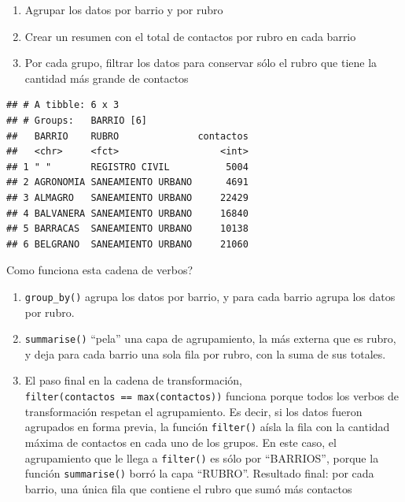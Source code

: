 \documentclass[spanish,]{book}
\newenvironment{Shaded}{\begin{snugshade}}{\end{snugshade}}
\newcommand{\DataTypeTok}[1]{\textcolor[rgb]{0.13,0.29,0.53}{#1}}
\newcommand{\KeywordTok}[1]{\textcolor[rgb]{0.13,0.29,0.53}{\textbf{#1}}}
\newcommand{\NormalTok}[1]{#1}
\newcommand{\OperatorTok}[1]{\textcolor[rgb]{0.81,0.36,0.00}{\textbf{#1}}}
\newcommand{\StringTok}[1]{\textcolor[rgb]{0.31,0.60,0.02}{#1}}
\providecommand{\tightlist}{%
  \setlength{\itemsep}{0pt}\setlength{\parskip}{0pt}}
\begin{document}
\begin{enumerate}
\def\labelenumi{\arabic{enumi}.}
\tightlist
\item
  Agrupar los datos por barrio y por rubro
\item
  Crear un resumen con el total de contactos por rubro en cada barrio
\item
  Por cada grupo, filtrar los datos para conservar sólo el rubro que tiene la cantidad más grande de contactos
\end{enumerate}

\begin{Shaded}
\end{Shaded}

\begin{verbatim}
## # A tibble: 6 x 3
## # Groups:   BARRIO [6]
##   BARRIO    RUBRO              contactos
##   <chr>     <fct>                  <int>
## 1 " "       REGISTRO CIVIL          5004
## 2 AGRONOMIA SANEAMIENTO URBANO      4691
## 3 ALMAGRO   SANEAMIENTO URBANO     22429
## 4 BALVANERA SANEAMIENTO URBANO     16840
## 5 BARRACAS  SANEAMIENTO URBANO     10138
## 6 BELGRANO  SANEAMIENTO URBANO     21060
\end{verbatim}

Como funciona esta cadena de verbos?

\begin{enumerate}
\def\labelenumi{\arabic{enumi}.}
\item
  \texttt{group\_by()} agrupa los datos por barrio, y para cada barrio agrupa los datos por rubro.
\item
  \texttt{summarise()} ``pela'' una capa de agrupamiento, la más externa que es rubro, y deja para cada barrio una sola fila por rubro, con la suma de sus totales.
\item
  El paso final en la cadena de transformación, \texttt{filter(contactos\ ==\ max(contactos))} funciona porque todos los verbos de transformación respetan el agrupamiento. Es decir, si los datos fueron agrupados en forma previa, la función \texttt{filter()} aísla la fila con la cantidad máxima de contactos en cada uno de los grupos. En este caso, el agrupamiento que le llega a \texttt{filter()} es sólo por ``BARRIOS'', porque la función \texttt{summarise()} borró la capa ``RUBRO''. Resultado final: por cada barrio, una única fila que contiene el rubro que sumó más contactos
\end{enumerate}
\end{document}
